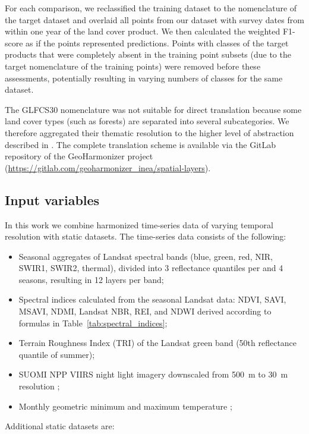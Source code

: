     For each comparison, we reclassified the training dataset to the nomenclature of the target dataset and overlaid all points from our dataset with survey dates from within one year of the land cover product. We then calculated the weighted F1-score as if the points represented predictions. Points with classes of the target products that were completely absent in the training point subsets (due to the target nomenclature of the training points) were removed before these assessments, potentially resulting in varying numbers of classes for the same dataset. 
    
    The GLFCS30 nomenclature was not suitable for direct translation because some land cover types (such as forests) are separated into several subcategories. We therefore aggregated their thematic resolution to the higher level of abstraction described in \citet{zhang2020glc_fcs30}. The complete translation scheme is available via the GitLab repository of the GeoHarmonizer project (\url{https://gitlab.com/geoharmonizer_inea/spatial-layers}).

\subsection*{Input variables}
    
    In this work we combine harmonized time-series data of varying temporal resolution with static datasets. The time-series data consists of the following:
    
    \begin{itemize}
    \item Seasonal aggregates of Landsat spectral bands (blue, green, red, NIR, SWIR1, SWIR2, thermal), divided into 3 reflectance quantiles per and 4 seasons, resulting in 12 layers per band;
    \item Spectral indices calculated from the seasonal Landsat data: NDVI, SAVI, MSAVI, NDMI, Landsat NBR, REI, and NDWI derived according to formulas in Table\@~\ref{tab:spectral_indices};
    \item Terrain Roughness Index (TRI) of the Landsat green band (50th reflectance quantile of summer);
    \item SUOMI NPP VIIRS night light imagery downscaled from 500~m to 30~m resolution \citep{hillger2013first};
    \item Monthly geometric minimum and maximum temperature \citep{kilibarda2014spatio};
    \end{itemize}
    
    Additional static datasets are:
    
